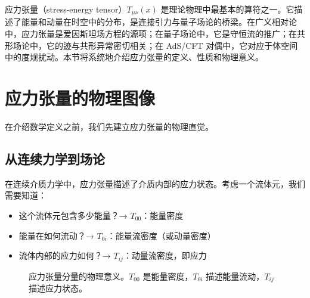
应力张量（stress-energy tensor）$T_{\mu\nu}(x)$ 是理论物理中最基本的算符之一。它描述了能量和动量在时空中的分布，是连接引力与量子场论的桥梁。在广义相对论中，应力张量是爱因斯坦场方程的源项；在量子场论中，它是守恒流的推广；在共形场论中，它的迹与共形异常密切相关；在 AdS/CFT 对偶中，它对应于体空间中的度规扰动\cite{Balasubramanian1999}。本节将系统地介绍应力张量的定义、性质和物理意义。

\section{应力张量的物理图像}

在介绍数学定义之前，我们先建立应力张量的物理直觉。

\subsection{从连续力学到场论}

在连续介质力学中，应力张量描述了介质内部的应力状态。考虑一个流体元，我们需要知道：
\begin{itemize}
    \item 这个流体元包含多少能量？→ $T_{00}$：能量密度
    \item 能量在如何流动？→ $T_{0i}$：能量流密度（或动量密度）
    \item 流体内部的应力如何？→ $T_{ij}$：动量流密度，即应力
\end{itemize}

\begin{figure}[htbp]
\centering
{}
\caption{应力张量分量的物理意义。$T_{00}$ 是能量密度，$T_{0i}$ 描述能量流动，$T_{ij}$ 描述应力状态。}
\label{fig:stress_tensor_components}
\end{figure}

